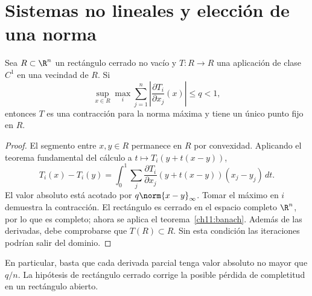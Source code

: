 \section{Sistemas no lineales y elección de una norma}
\begin{proposicion}\label{ch11:jacobiano}
Sea $R\subset\R^n$ un rectángulo cerrado no vacío y $T:R\to R$ una aplicación de clase $C^1$ en una vecindad de $R$. Si
\[
 \sup_{x\in R}\max_i\sum_{j=1}^n
 \left|\frac{\partial T_i}{\partial x_j}(x)\right|\leq q<1,
\]
entonces $T$ es una contracción para la norma máxima y tiene un único punto fijo en $R$.
\end{proposicion}
\begin{proof}
El segmento entre $x,y\in R$ permanece en $R$ por convexidad. Aplicando el teorema fundamental del cálculo a $t\mapsto T_i(y+t(x-y))$,
\[
 T_i(x)-T_i(y)=\int_0^1\sum_j
 \frac{\partial T_i}{\partial x_j}(y+t(x-y))(x_j-y_j)\,dt.
\]
El valor absoluto está acotado por $q\norm{x-y}_\infty$. Tomar el máximo en $i$ demuestra la contracción. El rectángulo es cerrado en el espacio completo $\R^n$, por lo que es completo; ahora se aplica el teorema~\ref{ch11:banach}. Además de las derivadas, debe comprobarse que $T(R)\subset R$. Sin esta condición las iteraciones podrían salir del dominio.
\end{proof}
En particular, basta que cada derivada parcial tenga valor absoluto no mayor que $q/n$. La hipótesis de rectángulo cerrado corrige la posible pérdida de completitud en un rectángulo abierto.

